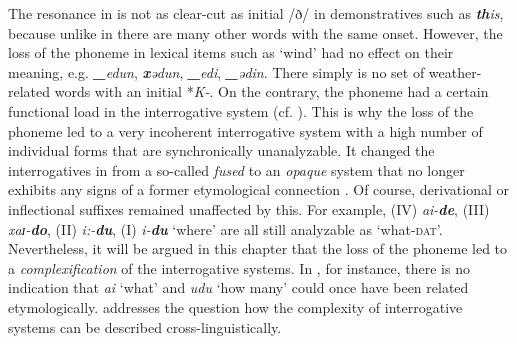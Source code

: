 \documentclass[output=paper,hidelinks]{langscibook}
\begin{document}
The resonance in  is not as clear-cut as  initial /ð/ in demonstratives such as \textit{\textbf{th}is}, because unlike in  there are many other words with the same onset. However, the loss of the phoneme in lexical items such as `wind' had no effect on their meaning, e.g.  \textit{\textbf{\_}edun},  \textit{\textbf{x}ədun},  \textit{\textbf{\_}edi},  \textit{\textbf{\_}ədin}. There simply is no set of weather-related words with an initial *\textit{K-}. On the contrary, the  phoneme had a certain functional load in the interrogative system (cf. \citealt{Langacker2001}). This is why the loss of the phoneme led to a very incoherent interrogative system with a high number of individual forms that are synchronically unanalyzable. It changed the interrogatives in  from a so-called \textit{fused} to an \textit{opaque} system that no longer exhibits any signs of a former etymological connection \citep{MuyskenSmith1990}. Of course, derivational or inflectional suffixes remained unaffected by this. For example,  (IV) \textit{ai-\textbf{de}},  (III) \textit{xaɪ-\textbf{do}},  (II) \textit{i:-\textbf{du}},  (I) \textit{i-\textbf{du}} `where' \citep[261]{HuZengyi2001} are all still analyzable as `what-\textsc{dat}'. Nevertheless, it will be argued in this chapter that the loss of the phoneme led to a \textit{complexification} of the  interrogative systems. In , for instance, there is no indication that \textit{ai} `what' and \textit{udu} `how many' could once have been related etymologically.  addresses the question how the complexity of interrogative systems can be described cross-linguistically.
\end{document}
